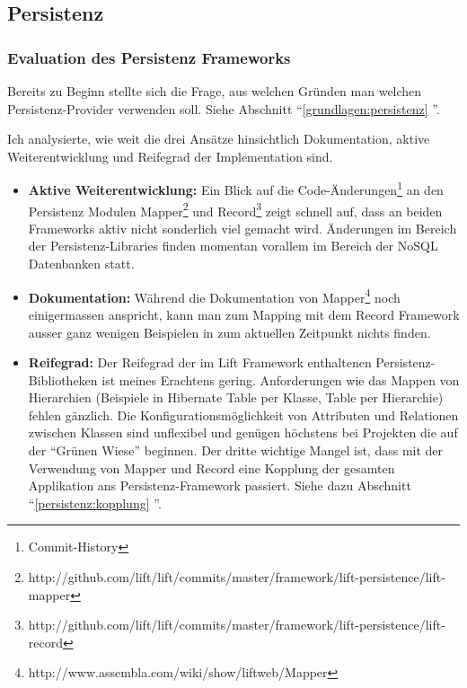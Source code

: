 \subsection{Persistenz}
\subsubsection{Evaluation des Persistenz Frameworks}
Bereits zu Beginn stellte sich die Frage, aus welchen Gr\"unden man welchen Persistenz-Provider verwenden soll. Siehe Abschnitt ``\ref{grundlagen:persistenz} ''.

Ich analysierte, wie weit die drei Ans\"atze hinsichtlich Dokumentation, aktive Weiterentwicklung und Reifegrad der Implementation sind.

\begin{itemize}
\item \textbf{Aktive Weiterentwicklung: }Ein Blick auf die Code-\"Anderungen\footnote{Commit-History} an den Persistenz Modulen Mapper\footnote{http://github.com/lift/lift/commits/master/framework/lift-persistence/lift-mapper} und Record\footnote{http://github.com/lift/lift/commits/master/framework/lift-persistence/lift-record} zeigt schnell auf, dass an beiden Frameworks aktiv nicht sonderlich viel gemacht wird. \"Anderungen im Bereich der Persistenz-Libraries finden momentan vorallem im Bereich der NoSQL Datenbanken statt. 

\item \textbf{Dokumentation: }W\"ahrend die Dokumentation von Mapper\footnote{http://www.assembla.com/wiki/show/liftweb/Mapper} noch einigermassen anspricht, kann man zum Mapping mit dem Record Framework ausser ganz wenigen Beispielen in \cite[p. 79 - 113]{chen2009lift} zum aktuellen Zeitpunkt nichts finden.

\item \textbf{Reifegrad: }Der Reifegrad der im Lift Framework enthaltenen Persistenz-Bibliotheken ist meines Erachtens gering. Anforderungen wie das Mappen von Hierarchien (Beispiele in Hibernate Table per Klasse, Table per Hierarchie) fehlen g\"anzlich. Die Konfigurationsm\"oglichkeit von Attributen und Relationen zwischen Klassen sind unflexibel und gen\"ugen h\"ochstens bei Projekten die auf der ``Gr\"unen Wiese'' beginnen. Der dritte wichtige Mangel ist, dass mit der Verwendung von Mapper und Record eine Kopplung der gesamten Applikation ans Persistenz-Framework passiert. Siehe dazu Abschnitt ``\ref{persistenz:kopplung} ''.
\end{itemize}

